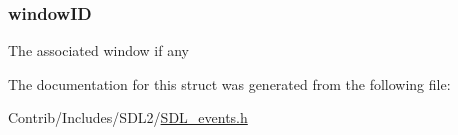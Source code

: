 \subsubsection[{\texorpdfstring{window\+ID}{windowID}}]{ window\+ID}\hypertarget{struct_s_d_l___user_event_a78d9995068d6f40cd78bb8db7351b0a1}{}\label{struct_s_d_l___user_event_a78d9995068d6f40cd78bb8db7351b0a1}
The associated window if any 

The documentation for this struct was generated from the following file\+:\begin{DoxyCompactItemize}
\item 
Contrib/\+Includes/\+S\+D\+L2/\hyperlink{_s_d_l__events_8h}{S\+D\+L\+\_\+events.\+h}\end{DoxyCompactItemize}
